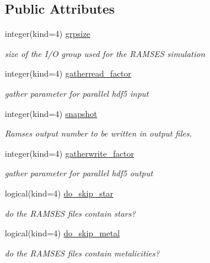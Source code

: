 \subsection*{Public Attributes}
\begin{DoxyCompactItemize}
\item 
integer(kind=4) \hyperlink{structmodconstant_1_1type__parameter__pfof__snap_a65535bf9bcf3c053b3828d83e2f40271}{grpsize}
\begin{DoxyCompactList}\small\item\em size of the I/O group used for the R\+A\+M\+S\+ES simulation \end{DoxyCompactList}\item 
integer(kind=4) \hyperlink{structmodconstant_1_1type__parameter__pfof__snap_a078d7fad865fe3a66900699ea0a786da}{gatherread\+\_\+factor}
\begin{DoxyCompactList}\small\item\em gather parameter for parallel hdf5 input \end{DoxyCompactList}\item 
integer(kind=4) \hyperlink{structmodconstant_1_1type__parameter__pfof__snap_aa9924ed26e50de32aa9bb74c85aa0d32}{snapshot}
\begin{DoxyCompactList}\small\item\em Ramses output number to be written in output files. \end{DoxyCompactList}\item 
integer(kind=4) \hyperlink{structmodconstant_1_1type__parameter__pfof__snap_afef04e15a6cc8639d9852b08b737927e}{gatherwrite\+\_\+factor}
\begin{DoxyCompactList}\small\item\em gather parameter for parallel hdf5 output \end{DoxyCompactList}\item 
logical(kind=4) \hyperlink{structmodconstant_1_1type__parameter__pfof__snap_a3d5e01fcda7d62315fe063fd879fca30}{do\+\_\+skip\+\_\+star}
\begin{DoxyCompactList}\small\item\em do the R\+A\+M\+S\+ES files contain stars? \end{DoxyCompactList}\item 
logical(kind=4) \hyperlink{structmodconstant_1_1type__parameter__pfof__snap_a348e60587afbd14ddb9a5f03afd4d825}{do\+\_\+skip\+\_\+metal}
\begin{DoxyCompactList}\small\item\em do the R\+A\+M\+S\+ES files contain metalicities? \end{DoxyCompactList}\item 

\end{DoxyCompactItemize}
